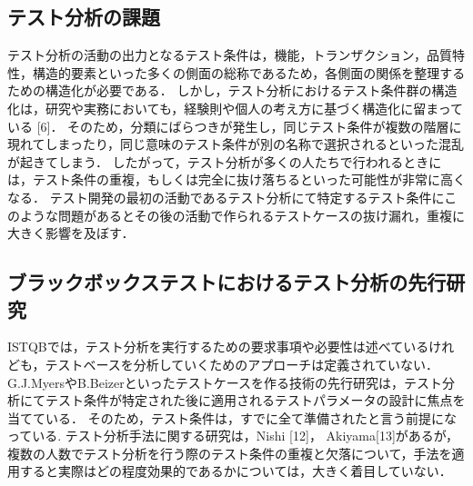 \documentclass[a4paper,12pt]{jreport}
\begin{document}
\subsection{テスト分析の課題}
テスト分析の活動の出力となるテスト条件は，機能，トランザクション，品質特性，構造的要素といった多くの側面の総称であるため，各側面の関係を整理するための構造化が必要である．
しかし，テスト分析におけるテスト条件群の構造化は，研究や実務においても，経験則や個人の考え方に基づく構造化に留まっている [6]．
そのため，分類にばらつきが発生し，同じテスト条件が複数の階層に現れてしまったり，同じ意味のテスト条件が別の名称で選択されるといった混乱が起きてしまう．
したがって，テスト分析が多くの人たちで行われるときには，テスト条件の重複，もしくは完全に抜け落ちるといった可能性が非常に高くなる．
テスト開発の最初の活動であるテスト分析にて特定するテスト条件にこのような問題があるとその後の活動で作られるテストケースの抜け漏れ，重複に大きく影響を及ぼす．

\subsection{ブラックボックステストにおけるテスト分析の先行研究}
ISTQBでは，テスト分析を実行するための要求事項や必要性は述べているけれども，テストベースを分析していくためのアプローチは定義されていない．
G.J.MyersやB.Beizerといったテストケースを作る技術の先行研究は，テスト分析にてテスト条件が特定された後に適用されるテストパラメータの設計に焦点を当てている．
そのため，テスト条件は，すでに全て準備されたと言う前提になっている.
テスト分析手法に関する研究は，Nishi [12]， Akiyama[13]があるが，複数の人数でテスト分析を行う際のテスト条件の重複と欠落について，手法を適用すると実際はどの程度効果的であるかについては，大きく着目していない．
\end{document}
